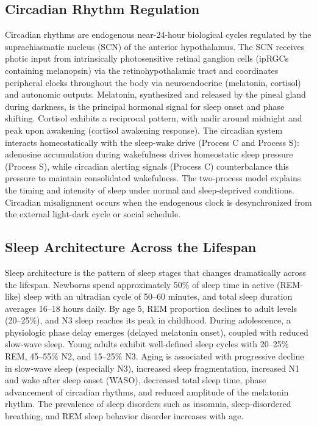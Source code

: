 \label{sec:Physiology of Sleep}

\subsection{Circadian Rhythm Regulation}
\label{sec:Circadian Rhythm Regulation}
Circadian rhythms are endogenous near-24-hour biological cycles regulated by the suprachiasmatic nucleus (SCN) of the anterior hypothalamus. The SCN receives photic input from intrinsically photosensitive retinal ganglion cells (ipRGCs containing melanopsin) via the retinohypothalamic tract and coordinates peripheral clocks throughout the body via neuroendocrine (melatonin, cortisol) and autonomic outputs. Melatonin, synthesized and released by the pineal gland during darkness, is the principal hormonal signal for sleep onset and phase shifting. Cortisol exhibits a reciprocal pattern, with nadir around midnight and peak upon awakening (cortisol awakening response). The circadian system interacts homeostatically with the sleep-wake drive (Process C and Process S): adenosine accumulation during wakefulness drives homeostatic sleep pressure (Process S), while circadian alerting signals (Process C) counterbalance this pressure to maintain consolidated wakefulness. The two-process model explains the timing and intensity of sleep under normal and sleep-deprived conditions. Circadian misalignment occurs when the endogenous clock is desynchronized from the external light-dark cycle or social schedule.

\subsection{Sleep Architecture Across the Lifespan}
\label{sec:Sleep Architecture Across the Lifespan}
Sleep architecture is the pattern of sleep stages that changes dramatically across the lifespan. Newborns spend approximately 50\% of sleep time in active (REM-like) sleep with an ultradian cycle of 50--60 minutes, and total sleep duration averages 16--18 hours daily. By age 5, REM proportion declines to adult levels (20--25\%), and N3 sleep reaches its peak in childhood. During adolescence, a physiologic phase delay emerges (delayed melatonin onset), coupled with reduced slow-wave sleep. Young adults exhibit well-defined sleep cycles with 20--25\% REM, 45--55\% N2, and 15--25\% N3. Aging is associated with progressive decline in slow-wave sleep (especially N3), increased sleep fragmentation, increased N1 and wake after sleep onset (WASO), decreased total sleep time, phase advancement of circadian rhythms, and reduced amplitude of the melatonin rhythm. The prevalence of sleep disorders such as insomnia, sleep-disordered breathing, and REM sleep behavior disorder increases with age.

